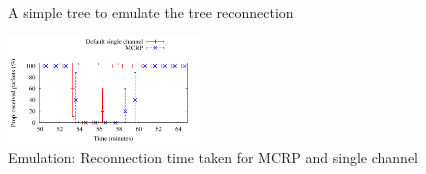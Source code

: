 \begin{figure}
\caption{A simple tree to emulate the tree reconnection}
\label{fig:reconnectionLayout}
\end{figure}

\begin{figure}
\centering
\includegraphics[width=0.45\textwidth]{figures/reconnect.pdf}
\caption{Emulation: Reconnection time taken for MCRP and single channel}
\label{fig:reconnection}
\end{figure}

